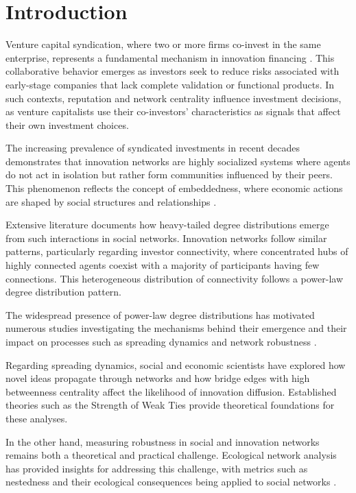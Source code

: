 \section{Introduction}


Venture capital syndication, where two or more firms co-invest in the same enterprise, represents a fundamental mechanism in innovation financing \cite{Granovetter1985}. This collaborative behavior emerges as investors seek to reduce risks associated with early-stage companies that lack complete validation or functional products. In such contexts, reputation and network centrality influence investment decisions, as venture capitalists use their co-investors' characteristics as signals that affect their own investment choices.

The increasing prevalence of syndicated investments in recent decades demonstrates that innovation networks are highly socialized systems where agents do not act in isolation but rather form communities influenced by their peers. This phenomenon reflects the concept of embeddedness, where economic actions are shaped by social structures and relationships \cite{Granovetter1985}.

Extensive literature documents how heavy-tailed degree distributions emerge from such interactions in social networks. Innovation networks follow similar patterns, particularly regarding investor connectivity, where concentrated hubs of highly connected agents coexist with a majority of participants having few connections. This heterogeneous distribution of connectivity follows a power-law degree distribution pattern.

The widespread presence of power-law degree distributions has motivated numerous studies investigating the mechanisms behind their emergence and their impact on processes such as spreading dynamics \cite{PastorSatorras2001} and network robustness \cite{Albert2000}.

Regarding spreading dynamics, social and economic scientists have explored how novel ideas propagate through networks and how bridge edges with high betweenness centrality affect the likelihood of innovation diffusion. Established theories such as the Strength of Weak Ties \cite{Granovetter1973} provide theoretical foundations for these analyses.

In the other hand, measuring robustness in social and innovation networks remains both a theoretical and practical challenge. Ecological network analysis has provided insights for addressing this challenge, with metrics such as nestedness and their ecological consequences being applied to social networks \cite{Theophile2024}.

